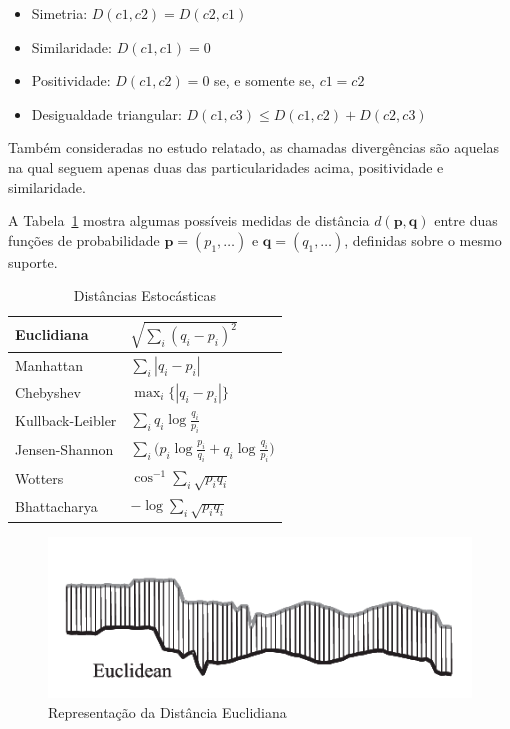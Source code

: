 \begin{itemize}

	\item Simetria:
	$D(c1,c2) = D(c2,c1)$
	\item Similaridade:
	$D(c1,c1) = 0$
	\item Positividade:
	$D(c1,c2) = 0$ se, e somente se, $c1 = c2$
	\item Desigualdade triangular:
	$D(c1,c3) \leq D(c1,c2) + D(c2,c3)$

\end{itemize}

Também consideradas no estudo relatado, as chamadas divergências são aquelas na qual seguem apenas duas das particularidades acima, positividade e similaridade.

A Tabela~\ref{Tab:Distancias} mostra algumas possíveis medidas de distância $d(\bm p,\bm q)$ entre duas funções de probabilidade $\bm p=(p_1,\dots)$ e $\bm q=(q_1,\dots)$, definidas sobre o mesmo suporte.

\begin{table}[hbt]
\centering
\begin{tabular}{p{3.8cm} p{5.0cm}}\toprule
Euclidiana					& $ \sqrt{\sum_i(q_i-p_i)^{2}}$\\
\hline
Manhattan					& $ \sum_{i}|q_i-p_i|$\\
\hline
Chebyshev					& $ \max_i\{|q_i-p_i|\}$\\
\hline
Kullback-Leibler			& $ \sum_{i}q_i\log\frac{q_i}{p_i}$\\
\hline
Jensen-Shannon				& $ \sum_{i} \Big(p_i \log\frac{p_i}{q_i} + q_i \log\frac{q_i}{p_i}\Big)$\\
\hline
Wotters						& $ \cos^{-1}\sum_{i} \sqrt{p_i q_i}$ \\
\hline
Bhattacharya				& $ -\log\sum_{i}\sqrt{p_i q_i}$ \\
\bottomrule
\end{tabular}
\vspace{0.5cm}
\caption{Distâncias Estocásticas}\label{Tab:Distancias}
\end{table}

\begin{figure}[!ht]
	\begin{center}
		\includegraphics[width=0.5\columnwidth]{capitulos/imagens/distance.png}
        \caption{Representação da Distância Euclidiana}
	\end{center}
\end{figure}

